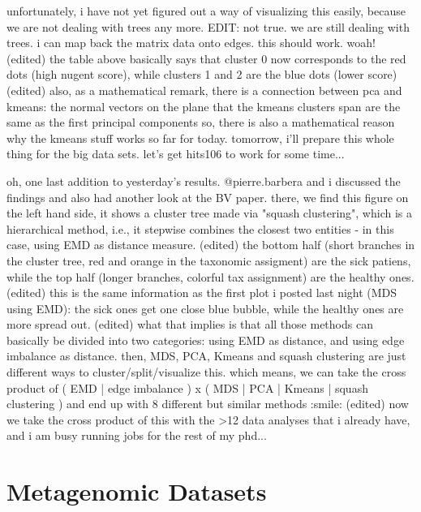 unfortunately, i have not yet figured out a way of visualizing this easily, because we are not dealing with trees any more. EDIT: not true. we are still dealing with trees. i can map back the matrix data onto edges. this should work. woah! (edited)
the table above basically says that cluster 0 now corresponds to the red dots (high nugent score), while clusters 1 and 2 are the blue dots (lower score) (edited)
also, as a mathematical remark, there is a connection between pca and kmeans: the normal vectors on the plane that the kmeans clusters span are the same as the first principal components
so, there is also a mathematical reason why the kmeans stuff works
so far for today. tomorrow, i'll prepare this whole thing for the big data sets. let's get hits106 to work for some time...

oh, one last addition to yesterday's results. @pierre.barbera  and i discussed the findings and also had another look at the BV paper. there, we find this figure
on the left hand side, it shows a cluster tree made via "squash clustering", which is a hierarchical method, i.e., it stepwise combines the closest two entities - in this case, using EMD as distance measure. (edited)
the bottom half (short branches in the cluster tree, red and orange in the taxonomic assigment) are the sick patiens, while the top half (longer branches, colorful tax assignment) are the healthy ones. (edited)
this is the same information as the first plot i posted last night (MDS using EMD): the sick ones get one close blue bubble, while the healthy ones are more spread out. (edited)
what that implies is that all those methods can basically be divided into two categories: using EMD as distance, and using edge imbalance as distance. then, MDS, PCA, Kmeans and squash clustering are just different ways to cluster/split/visualize this. which means, we can take the cross product of ( EMD | edge imbalance ) x ( MDS | PCA | Kmeans | squash clustering ) and end up with 8 different but similar methods :smile: (edited)
now we take the cross product of this with the >12 data analyses that i already have, and i am busy running jobs for the rest of my phd...


\section{Metagenomic Datasets}
\label{sec:MetagenomicDatasets}

